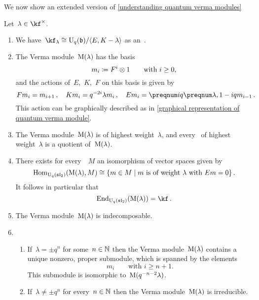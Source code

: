 \documentclass[a4paper, 11pt, oneside]{scrartcl}
\begin{document}
We now show an extended version of \cref{understanding quantum verma modules}

\begin{proposition}
  Let~$\lambda \in \kf^\times$.
  \begin{enumerate}
    \item
      We have~$\kf_\lambda \cong \Univ_q(\blie) / \gen{E, K - \lambda}$ as an~.
    \item
      The Verma module~$\operatorname{M}(\lambda)$ has the basis
      \[
        m_i
        \coloneqq
        F^i \otimes 1
        \qquad
        \text{with~$i \geq 0$,}
      \]
      and the actions of~$E$,~$K$,~$F$ on this basis is given by
      \[
        F m_i = m_{i+1} \,,
        \quad
        K m_i = q^{-2i} \lambda m_i \,,
        \quad
        E m_i = \qnum{i} \qnum{\lambda, 1-i} m_{i-1} \,.
      \]
      This action can be graphically described as in \cref{graphical representation of quantum verma module}.
    \item
      The Verma module~$\operatorname{M}(\lambda)$ is of highest weight~$\lambda$, and every~ of highest weight~$\lambda$ is a quotient of~$\operatorname{M}(\lambda)$.
    \item
      There exists for every~~$M$ an isomorphism of vector spaces given by
      \[
        \Hom_{\Univ_q(\sllie_2)}( \verma(\lambda), M )
        \cong
        \{
          m \in M
        \suchthat
          \text{$m$ is of weight~$\lambda$ with~$Em = 0$}
        \} \,.
      \]
      It follows in particular that
      \[
        \End_{\Univ_q(\sllie_2)}( \verma(\lambda) )
        =
        \kf \,.
      \]
    \item
      The Verma module~$\operatorname{M}(\lambda)$ is indecomposable.
    \item
      \begin{enumerate}
        \item
          If~$\lambda = \pm q^n$ for some~$n \in \mathbb{N}$ then the Verma module~$\operatorname{M}(\lambda)$ contains a unique nonzero, proper submodule, which is spanned by the elements
          \[
            m_i
            \qquad
            \text{with~$i \geq n+1$.}
          \]
          This submodule is isomorphic to~$\operatorname{M}(q^{-n-2} \lambda)$.
        \item
          If~$\lambda \neq \pm q^n$ for every~$n \in \mathbb{N}$ then the Verma module~$\operatorname{M}(\lambda)$ is irreducible.
      \end{enumerate}
  \end{enumerate}
\end{proposition}
\end{document}
